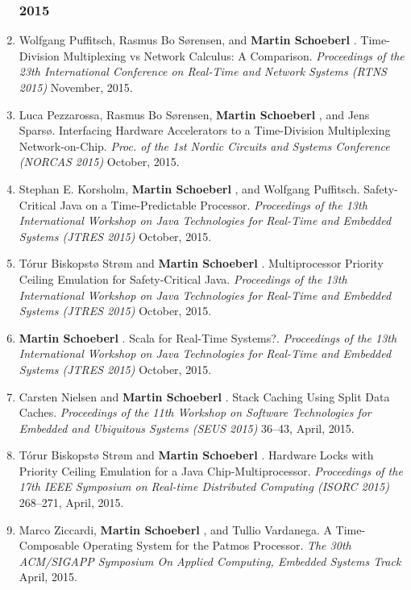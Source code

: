 \begin{enumerate}
\subsubsection*{2015}

\item Wolfgang Puffitsch, Rasmus Bo S\o{}rensen, and {\bf Martin Schoeberl }.
 Time-Division Multiplexing vs Network Calculus: A Comparison.
 \emph{Proceedings of the 23th International Conference on Real-Time and Network Systems (RTNS 2015)} November, 2015.

\item Luca Pezzarossa, Rasmus Bo S{\o}rensen, {\bf Martin Schoeberl }, and Jens Spars{\o}.
 Interfacing Hardware Accelerators to a Time-Division Multiplexing Network-on-Chip.
 \emph{Proc. of the 1st Nordic Circuits and Systems Conference (NORCAS 2015)} October, 2015.

\item Stephan E. Korsholm, {\bf Martin Schoeberl }, and Wolfgang Puffitsch.
 Safety-Critical Java on a Time-Predictable Processor.
 \emph{Proceedings of the 13th International Workshop on Java Technologies for Real-Time and Embedded Systems (JTRES 2015)} October, 2015.

\item T{\'o}rur Biskopst{\o} Str{\o}m and {\bf Martin Schoeberl }.
 Multiprocessor Priority Ceiling Emulation for Safety-Critical Java.
 \emph{Proceedings of the 13th International Workshop on Java Technologies for Real-Time and Embedded Systems (JTRES 2015)} October, 2015.

\item {\bf Martin Schoeberl }.
 Scala for Real-Time Systems?.
 \emph{Proceedings of the 13th International Workshop on Java Technologies for Real-Time and Embedded Systems (JTRES 2015)} October, 2015.

\item Carsten Nielsen and {\bf Martin Schoeberl }.
 Stack Caching Using Split Data Caches.
 \emph{Proceedings of the 11th Workshop on Software Technologies for Embedded and Ubiquitous Systems (SEUS 2015)} 36--43, April, 2015.

\item T{\'o}rur Biskopst{\o} Str{\o}m and {\bf Martin Schoeberl }.
 Hardware Locks with Priority Ceiling Emulation for a Java Chip-Multiprocessor.
 \emph{Proceedings of the 17th IEEE Symposium on Real-time Distributed Computing (ISORC 2015)} 268--271, April, 2015.

\item Marco Ziccardi, {\bf Martin Schoeberl }, and Tullio Vardanega.
 A Time-Composable Operating System for the Patmos Processor.
 \emph{The 30th ACM/SIGAPP Symposium On Applied Computing, Embedded Systems Track} April, 2015.


\end{enumerate}
